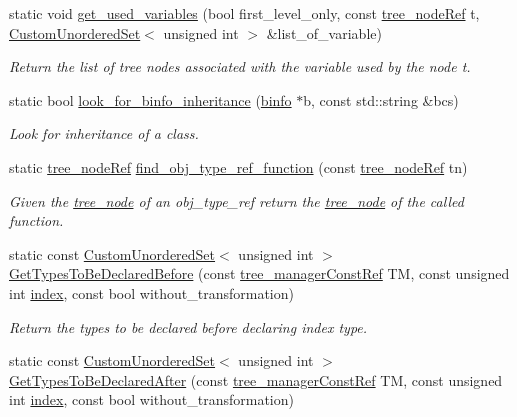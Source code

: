 \begin{DoxyCompactItemize}
static void \hyperlink{classtree__helper_a268bdfc7f6a52b970efc1715f557d55a}{get\+\_\+used\+\_\+variables} (bool first\+\_\+level\+\_\+only, const \hyperlink{tree__node_8hpp_a6ee377554d1c4871ad66a337eaa67fd5}{tree\+\_\+node\+Ref} t, \hyperlink{classCustomUnorderedSet}{Custom\+Unordered\+Set}$<$ unsigned int $>$ \&list\+\_\+of\+\_\+variable)
\begin{DoxyCompactList}\small\item\em Return the list of tree nodes associated with the variable used by the node t. \end{DoxyCompactList}\item 
static bool \hyperlink{classtree__helper_aab7b2a970899a09142e98fa196d57ec5}{look\+\_\+for\+\_\+binfo\+\_\+inheritance} (\hyperlink{structbinfo}{binfo} $\ast$b, const std\+::string \&bcs)
\begin{DoxyCompactList}\small\item\em Look for inheritance of a class. \end{DoxyCompactList}\item 
static \hyperlink{tree__node_8hpp_a6ee377554d1c4871ad66a337eaa67fd5}{tree\+\_\+node\+Ref} \hyperlink{classtree__helper_aa07e69b5707ad88e124dafaa12706804}{find\+\_\+obj\+\_\+type\+\_\+ref\+\_\+function} (const \hyperlink{tree__node_8hpp_a6ee377554d1c4871ad66a337eaa67fd5}{tree\+\_\+node\+Ref} tn)
\begin{DoxyCompactList}\small\item\em Given the \hyperlink{classtree__node}{tree\+\_\+node} of an obj\+\_\+type\+\_\+ref return the \hyperlink{classtree__node}{tree\+\_\+node} of the called function. \end{DoxyCompactList}\item 
static const \hyperlink{classCustomUnorderedSet}{Custom\+Unordered\+Set}$<$ unsigned int $>$ \hyperlink{classtree__helper_ad23c0a143e197b4b7c07036d975d1355}{Get\+Types\+To\+Be\+Declared\+Before} (const \hyperlink{tree__manager_8hpp_a792e3f1f892d7d997a8d8a4a12e39346}{tree\+\_\+manager\+Const\+Ref} TM, const unsigned int \hyperlink{tutorial__pact__2019_2Introduction_2third_2include_2Keccak_8h_a028c9bdc8344cca38ab522a337074797}{index}, const bool without\+\_\+transformation)
\begin{DoxyCompactList}\small\item\em Return the types to be declared before declaring index type. \end{DoxyCompactList}\item 
static const \hyperlink{classCustomUnorderedSet}{Custom\+Unordered\+Set}$<$ unsigned int $>$ \hyperlink{classtree__helper_af7f5272cbd83bc074170b7ef3a0e9d5f}{Get\+Types\+To\+Be\+Declared\+After} (const \hyperlink{tree__manager_8hpp_a792e3f1f892d7d997a8d8a4a12e39346}{tree\+\_\+manager\+Const\+Ref} TM, const unsigned int \hyperlink{tutorial__pact__2019_2Introduction_2third_2include_2Keccak_8h_a028c9bdc8344cca38ab522a337074797}{index}, const bool without\+\_\+transformation)

\end{DoxyCompactItemize}
